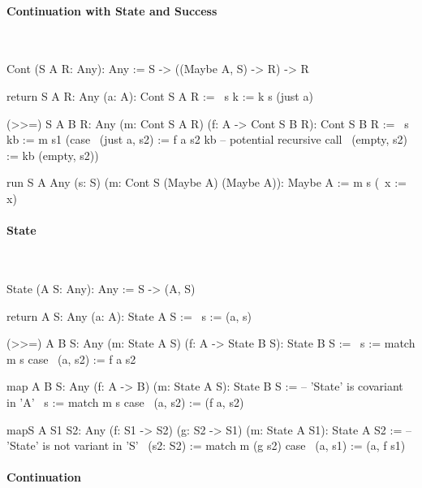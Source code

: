 \paragraph{Continuation with State and Success}

\ \begin{alba}
    Cont (S A R: Any): Any :=
        S -> ((Maybe A, S) -> R) -> R

    return {S A R: Any} (a: A): Cont S A R :=
        \ s k := k s (just a)

    (>>=) {S A B R: Any} (m: Cont S A R) (f: A -> Cont S B R): Cont S B R :=
        \ s kb :=
            m s1
              (case
                \ (just a, s2)  := f a s2 kb        -- potential recursive call
                \ (empty,  s2)  := kb (empty, s2))

    run {S A Any} (s: S) (m: Cont S (Maybe A) (Maybe A)): Maybe A :=
        m s (\ x := x)
\end{alba}







\paragraph{State}

\ \begin{alba}
    State (A S: Any): Any :=
        S -> (A, S)

    return {A S: Any} (a: A): State A S :=
        \ s := (a, s)

    (>>=) {A B S: Any} (m: State A S) (f: A -> State B S): State B S :=
        \ s :=
            match m s case
                \ (a, s2)  := f a s2

    map {A B S: Any} (f: A -> B) (m: State A S): State B S :=
            -- 'State' is covariant in 'A'
        \ s :=
            match m s case
                \ (a, s2) := (f a, s2)

    mapS {A S1 S2: Any} (f: S1 -> S2) (g: S2 -> S1) (m: State A S1): State A S2 :=
            -- 'State' is not variant in 'S'
        \ (s2: S2) :=
            match m (g s2)  case
                \ (a, s1) := (a, f s1)
\end{alba}




\paragraph{Continuation}

